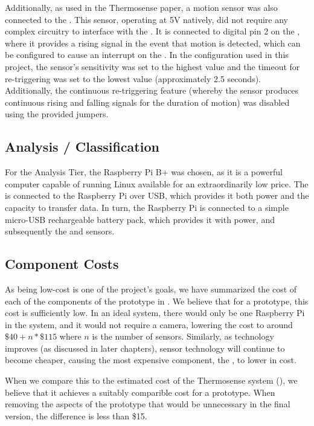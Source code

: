 \documentclass[../thesis/thesis.tex]{subfiles}
\begin{document}
Additionally, as used in the Thermosense paper, a \pir motion sensor \cite{AdafruitPIR} was also connected to the \ard. This sensor, operating at 5V natively, did not require any complex circuitry to interface with the \ard. It is connected to digital pin 2 on the \ard, where it provides a rising signal in the event that motion is detected, which can be configured to cause an interrupt on the \ard. In the configuration used in this project, the sensor's sensitivity was set to the highest value and the timeout for re-triggering was set to the lowest value (approximately 2.5 seconds). Additionally, the continuous re-triggering feature (whereby the sensor produces continuous rising and falling signals for the duration of motion) was disabled using the provided jumpers. 

\subsection{Analysis / Classification}

For the Analysis Tier, the Raspberry Pi B+ was chosen, as it is a powerful computer capable of running Linux available for an extraordinarily low price. The \ard is connected to the Raspberry Pi over USB, which provides it both power and the capacity to transfer data. In turn, the Raspberry Pi is connected to a simple micro-USB rechargeable battery pack, which provides it with power, and subsequently the \ard and sensors.

\subsection{Component Costs}
As being low-cost is one of the project's goals, we have summarized the cost of each of the components of the prototype in . We believe that for a prototype, this cost is sufficiently low. In an ideal system, there would only be one Raspberry Pi in the system, and it would not require a camera, lowering the cost to around $\$40 + n * \$115$ where $n$ is the number of sensors. Similarly, as technology improves (as discussed in later chapters), sensor technology will continue to become cheaper, causing the most expensive component, the \mlx, to lower in cost.

When we compare this to the estimated cost of the Thermosense system (), we believe that it achieves a suitably comparible cost for a prototype. When removing the aspects of the prototype that would be unnecessary in the final version, the difference is less than \$15.
\end{document}
